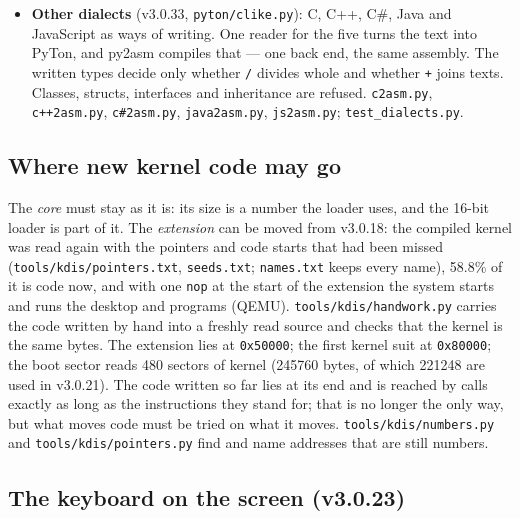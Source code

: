 \documentclass[11pt,a4paper]{article}
\newcommand{\file}[1]{\texttt{#1}}
\begin{document}
\begin{itemize}
      word. Memory is taken from the system 1 MB at a time; when a chunk is full the runtime
      marks every block that is pointed at (from the stack, the registers, the program's own
      data, then from block to block; any 8 bytes holding the address of a block count) and
      the rest becomes free and is used again first.
\item \textbf{Other dialects} (v3.0.33, \file{pyton/clike.py}): C, C++, C\#, Java and JavaScript
      as ways of writing. One reader for the five turns the text into PyTon, and py2asm
      compiles that --- one back end, the same assembly. The written types decide only
      whether \texttt{/} divides whole and whether \texttt{+} joins texts. Classes, structs,
      interfaces and inheritance are refused. \file{c2asm.py}, \file{c++2asm.py},
      \file{c\#2asm.py}, \file{java2asm.py}, \file{js2asm.py}; \file{test\_dialects.py}.
\end{itemize}

\subsection{Where new kernel code may go}

The \emph{core} must stay as it is: its size is a number the loader uses, and the 16-bit loader
is part of it. The \emph{extension} can be moved from v3.0.18: the compiled kernel was read
again with the pointers and code starts that had been missed (\file{tools/kdis/pointers.txt},
\file{seeds.txt}; \file{names.txt} keeps every name), 58.8\% of it is code now, and with one
\texttt{nop} at the start of the extension the system starts and runs the desktop and programs
(QEMU). \file{tools/kdis/handwork.py} carries the code written by hand into a freshly read
source and checks that the kernel is the same bytes. The extension lies at \texttt{0x50000};
the first kernel suit at \texttt{0x80000}; the boot sector reads 480 sectors of kernel
(245760 bytes, of which 221248 are used in v3.0.21). The code written so far lies at its end
and is reached by calls exactly as long as the instructions they stand for; that is no longer
the only way, but what moves code must be tried on what it moves. \file{tools/kdis/numbers.py} and
\file{tools/kdis/pointers.py} find and name addresses that are still numbers.

\subsection{The keyboard on the screen (v3.0.23)}
\end{document}
